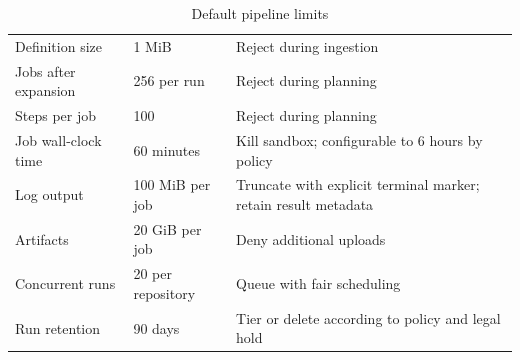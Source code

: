 \begin{table}[htbp]
\centering
\caption{Default pipeline limits}
\label{tab:limits}
\begin{tabularx}{\textwidth}{@{}L{0.33\textwidth}L{0.22\textwidth}Y@{}}
  \toprule
   &  &  \\
  \midrule
  Definition size & 1 MiB & Reject during ingestion \\
  Jobs after expansion & 256 per run & Reject during planning \\
  Steps per job & 100 & Reject during planning \\
  Job wall-clock time & 60 minutes & Kill sandbox; configurable to 6 hours by policy \\
  Log output & 100 MiB per job & Truncate with explicit terminal marker; retain result metadata \\
  Artifacts & 20 GiB per job & Deny additional uploads \\
  Concurrent runs & 20 per repository & Queue with fair scheduling \\
  Run retention & 90 days & Tier or delete according to policy and legal hold \\
  \bottomrule
\end{tabularx}
\end{table}

